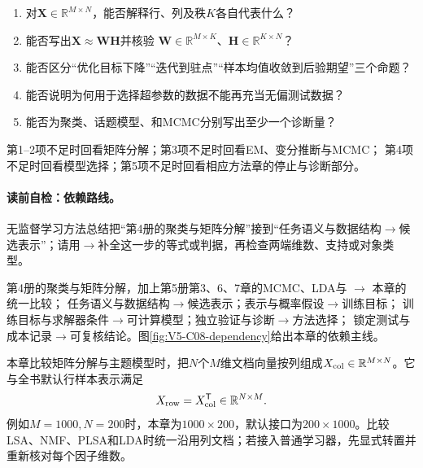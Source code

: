 \begin{precheckbox}
\begin{enumerate}[leftmargin=2.2em]
  \item 对$\boldsymbol X\in\mathbb R^{M\times N}$，能否解释行、列及秩$K$各自代表什么？
  \item 能否写出$\boldsymbol X\approx\boldsymbol W\boldsymbol H$并核验
  $\boldsymbol W\in\mathbb R^{M\times K}$、$\boldsymbol H\in\mathbb R^{K\times N}$？
  \item 能否区分“优化目标下降”“迭代到驻点”“样本均值收敛到后验期望”三个命题？
  \item 能否说明为何用于选择超参数的数据不能再充当无偏测试数据？
  \item 能否为聚类、话题模型、\PageRank{}和MCMC分别写出至少一个诊断量？
\end{enumerate}
第1--2项不足时回看矩阵分解；第3项不足时回看EM、变分推断与MCMC；
第4项不足时回看模型选择；第5项不足时回看相应方法章的停止与诊断部分。
\end{precheckbox}

\label{struct:V5-C08-CH04}
\paragraph{读前自检：依赖路线。}无监督学习方法总结把“第4册的聚类与矩阵分解”接到“任务语义与数据结构$\to$候选表示”；请用$\to$补全这一步的等式或判据，再检查两端维数、支持或对象类型。\par

\begin{dependencybox}
第4册的聚类与矩阵分解，加上第5册第3、6、7章的MCMC、LDA与\PageRank{} $\to$ 本章的统一比较；
任务语义与数据结构$\to$候选表示；表示与概率假设$\to$训练目标；
训练目标与求解器条件$\to$可计算模型；独立验证与诊断$\to$方法选择；
锁定测试与成本记录$\to$可复核结论。图\ref{fig:V5-C08-dependency}给出本章的依赖主线。
\end{dependencybox}


\begin{keypointbox}[title=数据方向桥：总结章统一采用列对象]
本章比较矩阵分解与主题模型时，把$N$个$M$维文档向量按列组成$X_{\rm col}\in\mathbb R^{M\times N}$。它与全书默认行样本表示满足
\[
X_{\rm row}=X_{\rm col}^{\mathsf T}
\in\mathbb R^{N\times M}.
\]
例如$M=1000,N=200$时，本章为$1000\times200$，默认接口为$200\times1000$。比较LSA、NMF、PLSA和LDA时统一沿用列文档；若接入普通学习器，先显式转置并重新核对每个因子维数。
\end{keypointbox}

